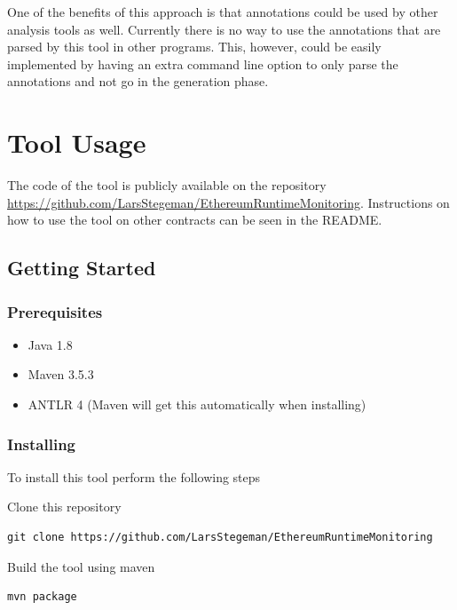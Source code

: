 \documentclass[a4paper]{article}
\begin{document}
One of the benefits of this approach is that annotations could be used by other analysis tools as well. Currently there is no way to use the annotations that are parsed by this tool in other programs. This, however, could be easily implemented by having an extra command line option to only parse the annotations and not go in the generation phase. 

\newpage
\appendix
\section{Tool Usage}
The code of the tool is publicly available on the repository \url{https://github.com/LarsStegeman/EthereumRuntimeMonitoring}. Instructions on how to use the tool on other contracts can be seen in the README.

\hypertarget{getting-started}{%
\subsection{Getting Started}\label{getting-started}}

\hypertarget{prerequisites}{%
\subsubsection{Prerequisites}\label{prerequisites}}

\begin{itemize}
\item
  Java 1.8
\item
  Maven 3.5.3
\item
  ANTLR 4 (Maven will get this automatically when installing)
\end{itemize}

\hypertarget{installing}{%
\subsubsection{Installing}\label{installing}}

To install this tool perform the following steps

Clone this repository

\begin{verbatim}
git clone https://github.com/LarsStegeman/EthereumRuntimeMonitoring
\end{verbatim}

Build the tool using maven

\begin{verbatim}
mvn package
\end{verbatim}
\end{document}
